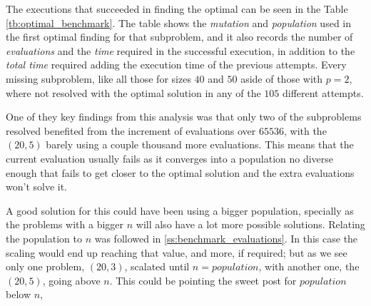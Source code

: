 The executions that succeeded in finding the optimal can be seen in the Table \ref{tb:optimal_benchmark}.
The table shows the \emph{mutation} and \emph{population} used in the first optimal finding for that subproblem,
and it also records the number of \emph{evaluations} and the \emph{time} required in the successful 
execution, in addition to the \emph{total time} required adding the execution time of the previous attempts.
Every missing subproblem, like all those for sizes $40$ and $50$ aside of those with $p=2$, where not
resolved with the optimal solution in any of the $105$ different attempts.



One of they key findings from this analysis was that only two of the subproblems resolved benefited from
the increment of evaluations over $65536$, with the $(20,5)$ barely using a couple thousand more evaluations.
This means that the current evaluation usually fails as it converges into a population no diverse enough
that fails to get closer to the optimal solution and the extra evaluations won't solve it.

A good solution for this could have been using a bigger population, specially as the problems with a
bigger $n$ will also have a lot more possible solutions. Relating the population to $n$ was followed in \ref{ss:benchmark_evaluations}.
In this case the scaling would end up reaching that value, and more, if required; but as we see only one
problem, $(20,3)$, scalated until $n=population$, with another one, the $(20,5)$, going above $n$. This
could be pointing the sweet post for $population$ below $n$,

